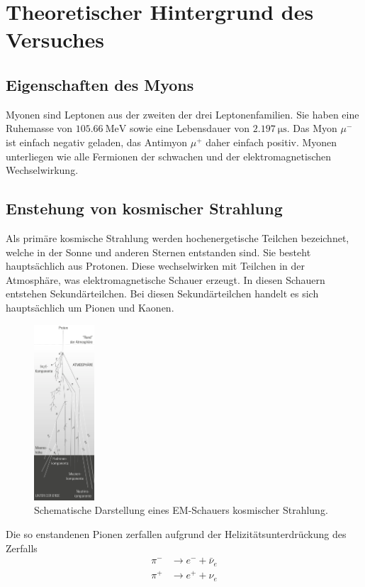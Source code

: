 \section{Theoretischer Hintergrund des Versuches}
\label{sec:Theorie}
\subsection{Eigenschaften des Myons}
\label{subsec:Eigenschaften}
Myonen sind Leptonen aus der zweiten der drei Leptonenfamilien. Sie haben
eine Ruhemasse von $\SI{105.66}{\mega\electronvolt}$ sowie eine Lebensdauer
von $\SI{2.197}{\micro\second}$. Das Myon $\mu^{-}$ ist einfach negativ geladen,
das Antimyon $\mu^{+}$ daher einfach positiv.
Myonen unterliegen wie alle Fermionen der schwachen und der elektromagnetischen
Wechselwirkung.
\subsection{Enstehung von kosmischer Strahlung}
\label{subsec:kosmischeStrahlung}
Als primäre kosmische Strahlung werden hochenergetische Teilchen bezeichnet, welche
in der Sonne und anderen Sternen entstanden sind. Sie besteht hauptsächlich aus Protonen.
Diese wechselwirken mit Teilchen in der Atmosphäre, was elektromagnetische
Schauer erzeugt. In diesen Schauern entstehen Sekundärteilchen. Bei diesen
Sekundärteilchen handelt es sich hauptsächlich um Pionen und Kaonen.
\begin{figure}
  \centering
  \includegraphics[width=0.2\textwidth]{pictures/Schauer.png}
  \caption{Schematische Darstellung eines EM-Schauers kosmischer Strahlung. \cite{Q1}}
  \label{fig:schauer}
\end{figure}
\noindent
Die so enstandenen Pionen zerfallen aufgrund der Helizitätsunterdrückung
des Zerfalls
\begin{align*}
  \pi^{-} & \rightarrow e^{-} + \bar{\nu}_{e} \\
  \pi^{+} & \rightarrow e^{+} + \nu_{e}
\end{align*}
